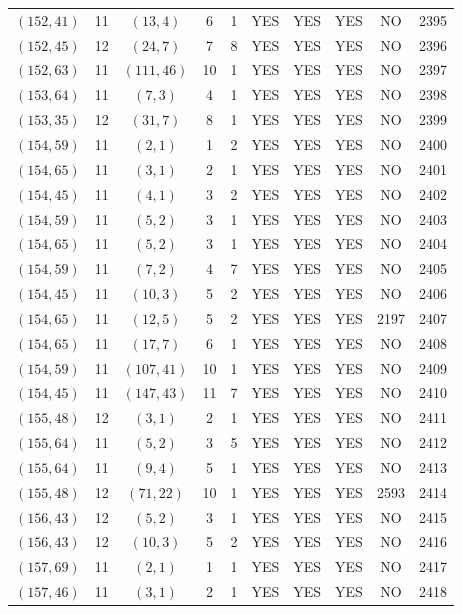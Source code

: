 \begin{longtable}{|c|c|c|c|c|c|c|c|c|c|}
$(152, 41)$ & 11 & $(13, 4)$ & 6 & 1 & YES & YES & YES & NO & 2395\\
$(152, 45)$ & 12 & $(24, 7)$ & 7 & 8 & YES & YES & YES & NO & 2396\\
$(152, 63)$ & 11 & $(111, 46)$ & 10 & 1 & YES & YES & YES & NO & 2397\\
$(153, 64)$ & 11 & $(7, 3)$ & 4 & 1 & YES & YES & YES & NO & 2398\\
$(153, 35)$ & 12 & $(31, 7)$ & 8 & 1 & YES & YES & YES & NO & 2399\\
$(154, 59)$ & 11 & $(2, 1)$ & 1 & 2 & YES & YES & YES & NO & 2400\\
$(154, 65)$ & 11 & $(3, 1)$ & 2 & 1 & YES & YES & YES & NO & 2401\\
$(154, 45)$ & 11 & $(4, 1)$ & 3 & 2 & YES & YES & YES & NO & 2402\\
$(154, 59)$ & 11 & $(5, 2)$ & 3 & 1 & YES & YES & YES & NO & 2403\\
$(154, 65)$ & 11 & $(5, 2)$ & 3 & 1 & YES & YES & YES & NO & 2404\\
$(154, 59)$ & 11 & $(7, 2)$ & 4 & 7 & YES & YES & YES & NO & 2405\\
$(154, 45)$ & 11 & $(10, 3)$ & 5 & 2 & YES & YES & YES & NO & 2406\\
$(154, 65)$ & 11 & $(12, 5)$ & 5 & 2 & YES & YES & YES & 2197 & 2407\\
$(154, 65)$ & 11 & $(17, 7)$ & 6 & 1 & YES & YES & YES & NO & 2408\\
$(154, 59)$ & 11 & $(107, 41)$ & 10 & 1 & YES & YES & YES & NO & 2409\\
$(154, 45)$ & 11 & $(147, 43)$ & 11 & 7 & YES & YES & YES & NO & 2410\\
$(155, 48)$ & 12 & $(3, 1)$ & 2 & 1 & YES & YES & YES & NO & 2411\\
$(155, 64)$ & 11 & $(5, 2)$ & 3 & 5 & YES & YES & YES & NO & 2412\\
$(155, 64)$ & 11 & $(9, 4)$ & 5 & 1 & YES & YES & YES & NO & 2413\\
$(155, 48)$ & 12 & $(71, 22)$ & 10 & 1 & YES & YES & YES & 2593 & 2414\\
$(156, 43)$ & 12 & $(5, 2)$ & 3 & 1 & YES & YES & YES & NO & 2415\\
$(156, 43)$ & 12 & $(10, 3)$ & 5 & 2 & YES & YES & YES & NO & 2416\\
$(157, 69)$ & 11 & $(2, 1)$ & 1 & 1 & YES & YES & YES & NO & 2417\\
$(157, 46)$ & 11 & $(3, 1)$ & 2 & 1 & YES & YES & YES & NO & 2418\\

\end{longtable}
